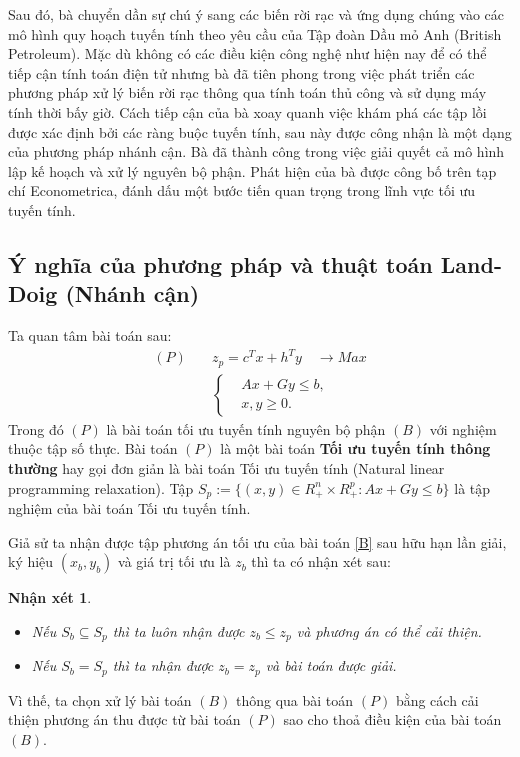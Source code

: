 \documentclass[12pt,a4paper]{report}
\newtheorem{nx}{Nhận xét}
\begin{document}
Sau đó, bà chuyển dần sự chú ý sang các biến rời rạc và ứng dụng chúng vào các mô hình quy hoạch tuyến tính theo yêu cầu của Tập đoàn Dầu mỏ Anh (British Petroleum). Mặc dù không có các điều kiện công nghệ như hiện nay để có thể tiếp cận tính toán điện tử nhưng bà đã tiên phong trong việc phát triển các phương pháp xử lý biến rời rạc thông qua tính toán thủ công và sử dụng máy tính thời bấy giờ. Cách tiếp cận của bà xoay quanh việc khám phá các tập lồi được xác định bởi các ràng buộc tuyến tính, sau này được công nhận là một dạng của phương pháp nhánh cận. Bà đã thành công trong việc giải quyết cả mô hình lập kế hoạch và xử lý nguyên bộ phận. Phát hiện của bà được công bố trên tạp chí Econometrica, đánh dấu một bước tiến quan trọng trong lĩnh vực tối ưu tuyến tính. \cite{Land1960AnAM}


\subsection{Ý nghĩa của phương pháp và thuật toán Land-Doig (Nhánh cận)}

Ta quan tâm bài toán sau:
\begin{equation}\label{P}
\begin{split}
(P) \quad & z_p=c^Tx+h^Ty \quad \longrightarrow Max \\
            & \left\{\begin{split}
                &Ax+Gy \leq  b, \\
                &x,y \geq 0.
            \end{split}\right.    
\end{split}
\end{equation}
Trong đó $(P)$ là bài toán tối ưu tuyến tính nguyên bộ phận $(B)$ với nghiệm thuộc tập số thực.
Bài toán $(P)$ là một bài toán \textbf{Tối ưu tuyến tính thông thường} hay gọi đơn giản là bài toán Tối ưu tuyến tính (Natural linear programming relaxation).
Tập $S_p:=\{(x,y)\in R^n_+\times R^p_+: Ax+Gy\leq b\}$ là tập nghiệm của bài toán Tối ưu tuyến tính.

Giả sử ta nhận được tập phương án tối ưu của bài toán \eqref{B} sau hữu hạn lần giải, ký hiệu $(x_b, y_b)$ và giá trị tối ưu là $z_b$ thì ta có nhận xét sau:
\begin{nx} \label{nx}
\phantom{abc}
\begin{itemize}
\item Nếu $S_b \subseteq S_p$ thì ta luôn nhận được $z_b \leq z_p$ và phương án có thể cải thiện.
\item Nếu $S_b = S_p$ thì ta nhận được $z_b = z_p$ và bài toán được giải.
\end{itemize}    
\end{nx}
Vì thế, ta chọn xử lý bài toán $(B)$ thông qua bài toán $(P)$ bằng cách cải thiện phương án thu được từ bài toán $(P)$ sao cho thoả điều kiện của bài toán $(B)$.
\end{document}
